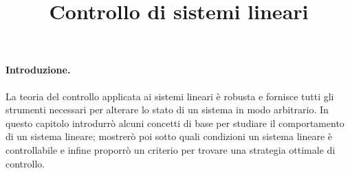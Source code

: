 \title{Controllo di sistemi lineari}
\maketitle
\label{sec:linear-control}

\paragraph{Introduzione.}

La teoria del controllo applicata ai sistemi lineari è robusta e fornisce tutti gli strumenti necessari
per alterare lo stato di un sistema in modo arbitrario. In questo capitolo introdurrò alcuni
concetti di base per studiare il comportamento di un sistema lineare; mostrerò poi sotto quali
condizioni un sistema lineare è controllabile e infine proporrò un criterio per trovare una strategia
ottimale di controllo.



